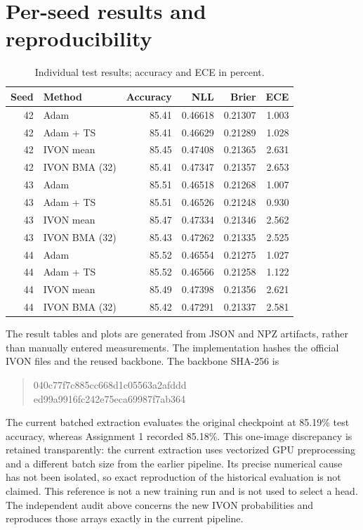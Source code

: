 \documentclass[11pt,a4paper]{article}
\begin{document}
\clearpage\appendix
\section{Per-seed results and reproducibility}
\begin{table}[H]\centering\small
\caption{Individual test results; accuracy and ECE in percent.}
\begin{tabular}{rlrrrr}\toprule
Seed & Method & Accuracy & NLL & Brier & ECE \\\midrule
42 & Adam & 85.41 & 0.46618 & 0.21307 & 1.003 \\
42 & Adam + TS & 85.41 & 0.46629 & 0.21289 & 1.028 \\
42 & IVON mean & 85.45 & 0.47408 & 0.21365 & 2.631 \\
42 & IVON BMA (32) & 85.41 & 0.47347 & 0.21357 & 2.653 \\
43 & Adam & 85.51 & 0.46518 & 0.21268 & 1.007 \\
43 & Adam + TS & 85.51 & 0.46526 & 0.21248 & 0.930 \\
43 & IVON mean & 85.47 & 0.47334 & 0.21346 & 2.562 \\
43 & IVON BMA (32) & 85.43 & 0.47262 & 0.21335 & 2.525 \\
44 & Adam & 85.52 & 0.46554 & 0.21275 & 1.027 \\
44 & Adam + TS & 85.52 & 0.46566 & 0.21258 & 1.122 \\
44 & IVON mean & 85.49 & 0.47398 & 0.21356 & 2.621 \\
44 & IVON BMA (32) & 85.42 & 0.47291 & 0.21337 & 2.581 \\
\bottomrule\end{tabular}\end{table}
The result tables and plots are generated from JSON and NPZ artifacts, rather
than manually entered measurements. The implementation hashes the official IVON
files and the reused backbone. The backbone SHA-256 is
\begin{quote}\small\ttfamily
040c77f7c885cc668d1c05563a2afddd\\ed99a9916fc242e75eca69987f7ab364
\end{quote}
The current batched extraction evaluates the original checkpoint at 85.19\%
test accuracy, whereas Assignment 1 recorded 85.18\%. This one-image discrepancy
is retained transparently: the current extraction uses vectorized GPU preprocessing
and a different batch size from the earlier pipeline. Its precise numerical cause
has not been isolated, so exact reproduction of the historical evaluation is not
claimed. This reference is not a new training run and is not used to select a head.
The independent audit above concerns the new IVON probabilities and reproduces
those arrays exactly in the current pipeline.
\end{document}
